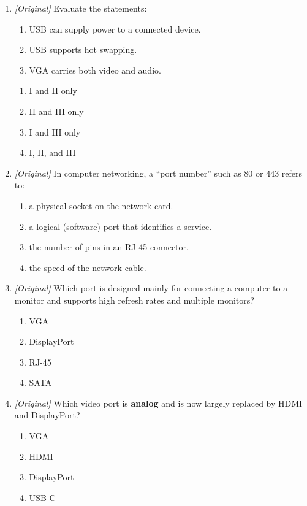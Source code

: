 \documentclass[11pt]{article}
\begin{document}
\begin{enumerate}[label=\textbf{Q\arabic*.}, leftmargin=*]
\begin{enumerate}[label=\Alph*.]
    \item HDMI
  \end{enumerate}
\item \textit{[Original]} Evaluate the statements:
  \begin{enumerate}[label=\Roman*.]
    \item USB can supply power to a connected device.
    \item USB supports hot swapping.
    \item VGA carries both video and audio.
  \end{enumerate}
  \begin{enumerate}[label=\Alph*.]
    \item I and II only
    \item II and III only
    \item I and III only
    \item I, II, and III
  \end{enumerate}
\item \textit{[Original]} In computer networking, a ``port number'' such as
  80 or 443 refers to:
  \begin{enumerate}[label=\Alph*.]
    \item a physical socket on the network card.
    \item a logical (software) port that identifies a service.
    \item the number of pins in an RJ-45 connector.
    \item the speed of the network cable.
  \end{enumerate}
\item \textit{[Original]} Which port is designed mainly for connecting a
  computer to a monitor and supports high refresh rates and multiple
  monitors?
  \begin{enumerate}[label=\Alph*.]
    \item VGA
    \item DisplayPort
    \item RJ-45
    \item SATA
  \end{enumerate}
\item \textit{[Original]} Which video port is \textbf{analog} and is now
  largely replaced by HDMI and DisplayPort?
  \begin{enumerate}[label=\Alph*.]
    \item VGA
    \item HDMI
    \item DisplayPort
    \item USB-C

\end{enumerate}
\end{enumerate}
\end{document}

